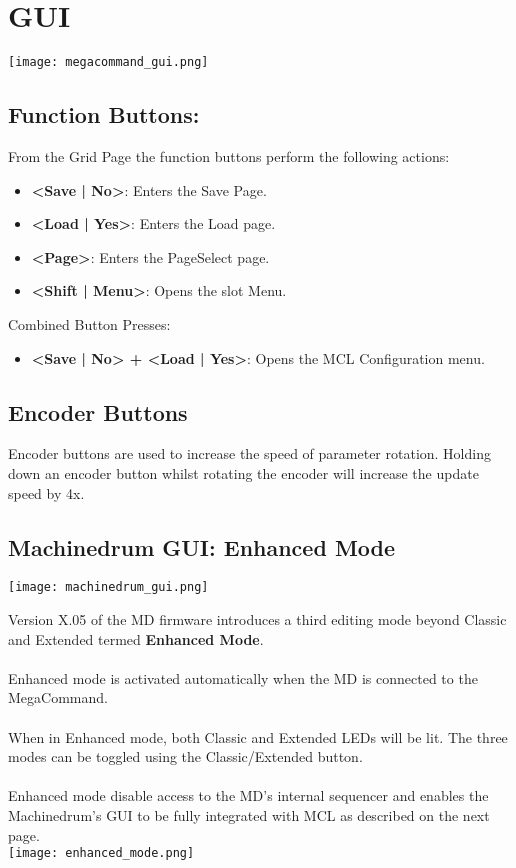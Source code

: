 \chapter{GUI}
\begin{center}
   \texttt{[image: megacommand\_gui.png]}
\end{center}
\section{Function Buttons:}
From the Grid Page the function buttons perform the following actions:
\begin{itemize}
\item{\textbf{<Save | No>}: Enters the Save Page.}
\item{\textbf{<Load | Yes>}: Enters the Load page.}
\item{\textbf{<Page>}: Enters the PageSelect page.}
\item{\textbf{<Shift | Menu>}: Opens the slot Menu. }
\end{itemize}
Combined Button Presses:
\begin{itemize}
\item{\textbf{<Save | No> + <Load | Yes>}: Opens the MCL Configuration menu. }
\end{itemize}

\section{Encoder Buttons}
Encoder buttons are used to increase the speed of parameter rotation.
Holding down an encoder button whilst rotating the encoder will increase the update speed by 4x.

\newpage
\section{Machinedrum GUI: Enhanced Mode}
\texttt{[image: machinedrum\_gui.png]}

Version X.05 of the MD firmware introduces a third editing mode beyond Classic and Extended termed \textbf{Enhanced Mode}.\\
\\
Enhanced mode is activated automatically when the MD is connected to the MegaCommand.\\
\\
When in Enhanced mode, both Classic and Extended LEDs will be lit. The three modes can be toggled using the Classic/Extended button.\\
\\
Enhanced mode disable access to the MD's internal sequencer and enables the Machinedrum's GUI to be fully integrated with MCL as described on the next page.
\\
\texttt{[image: enhanced\_mode.png]}
\newpage
